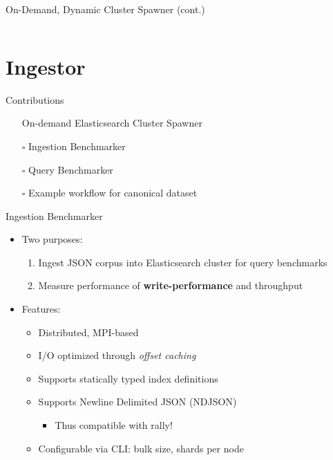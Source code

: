 \documentclass[compress,aspectratio=169]{beamer}
\newcommand{\ccheckmark}{\mbox{\ooalign{$\checkmark$\cr\hidewidth$\square$\hidewidth\cr}}}
\newcommand{\ccheckbox}{\mbox{$\square$}}
\begin{document}
  \begin{frame}[fragile]{On-Demand, Dynamic Cluster Spawner (cont.)}
    \begin{tcolorbox}[title=Example Generated Config]
    \footnotesize\inputminted[xleftmargin=1em,linenos]{yaml}{./assets/escfg.yml}
    \end{tcolorbox}
	\end{frame}

	\section{Ingestor}
  \begin{frame}{Contributions}
    \begin{center}
      \begin{itemize}
        \item[\ccheckmark] On-demand Elasticsearch Cluster Spawner
        \item[\ccheckbox] Ingestion Benchmarker
        \item[\ccheckbox] Query Benchmarker
        \item[\ccheckbox] Example workflow for canonical dataset
      \end{itemize}
    \end{center}
  \end{frame}
  
	\begin{frame}{Ingestion Benchmarker}
    \begin{itemize}
      \item Two purposes:
        \begin{enumerate}
          \item Ingest JSON corpus into Elasticsearch cluster for query benchmarks
          \item Measure performance of \textbf{write-performance} and throughput
        \end{enumerate}
      \item Features:
        \begin{itemize}
          \item Distributed, MPI-based
          \item I/O optimized through \emph{offset caching}
          \item Supports statically typed index definitions
          \item Supports Newline Delimited JSON (NDJSON)
            \begin{itemize}
              \item Thus compatible with rally!
            \end{itemize}
          \item Configurable via CLI: bulk size, shards per node
        \end{itemize}
    \end{itemize}
	\end{frame}
\end{document}
